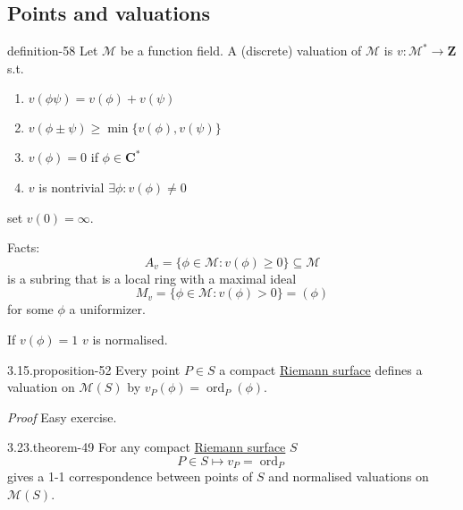 \documentclass[10pt,]{book}
\makeatletter
\renewcommand*{\proofname}{Proof}
\renewenvironment{proof}[1][\proofname]{\par
  \pushQED{\qed}%
  \normalfont \topsep6\p@\@plus6\p@\relax
  \trivlist
  \item\relax
    {\itshape
    #1\@addpunct{.}}\hspace\labelsep\ignorespaces
}{%
  \popQED\endtrivlist\@endpefalse
}
\numberwithin{equation}{section}
\newcommand{\ZZ}{\mathbf{Z}}
\newcommand{\CC}{\mathbf{C}}
\DeclareMathOperator{\ord}{ord}
\newcommand{\gt}{>}
\makeatother
\begin{document}
\subsection[{Points and valuations}]{Points and valuations}\label{subsection-56}
\begin{definition}{}{definition-58}%
\hypertarget{p-615}{}%
Let \(\mathcal M\) be a function field. A (discrete) valuation of \(\mathcal M\) is \(v \colon \mathcal M^* \to \ZZ\) s.t.\leavevmode%
\begin{enumerate}
\item\hypertarget{li-121}{}\(v(\phi\psi) = v(\phi)  + v(\psi)\)%
\item\hypertarget{li-122}{}\(v(\phi\pm\psi) \ge \min\{ v(\phi)  , v(\psi)\}\)%
\item\hypertarget{li-123}{}\(v(\phi) = 0 \) if \(\phi \in \CC^*\)%
\item\hypertarget{li-124}{}\(v\) is nontrivial \(\exists \phi : v(\phi)\ne 0\)%
\end{enumerate}
set \(v(0) = \infty\).%
\end{definition}
\hypertarget{p-616}{}%
Facts:%
\begin{equation*}
A_v = \{\phi \in \mathcal M : v(\phi) \ge 0 \} \subseteq \mathcal M
\end{equation*}
is a subring that is a local ring with a maximal ideal%
\begin{equation*}
M_v = \{ \phi\in \mathcal M : v(\phi) \gt 0\} = (\phi)
\end{equation*}
for some \(\phi\) a uniformizer.%
\par
\hypertarget{p-617}{}%
If \(v(\phi) = 1\) \(v\) is normalised.%
\begin{proposition}{3.15.}{}{proposition-52}%
\hypertarget{p-618}{}%
Every point \(P \in S\) a compact \hyperref[def-top-riem-surface]{Riemann surface} defines a valuation on \(\mathcal M(S)\) by \(v_P(\phi) = \ord_P(\phi)\).%
\end{proposition}
\begin{proof}\hypertarget{proof-92}{}
\hypertarget{p-619}{}%
Easy exercise.%
\end{proof}
\begin{theorem}{3.23.}{}{theorem-49}%
\hypertarget{p-620}{}%
For any compact \hyperref[def-top-riem-surface]{Riemann surface} \(S\)%
\begin{equation*}
P\in S \mapsto v_P = \ord_P
\end{equation*}
gives a 1-1 correspondence between points of \(S\) and normalised valuations on \(\mathcal M(S)\).%
\end{theorem}
\end{document}
